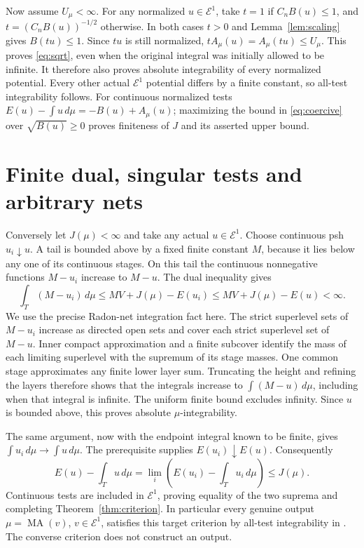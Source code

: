 \documentclass[11pt]{article}
\newcommand{\MA}{\operatorname{MA}}
\newcommand{\E}{\mathcal E}
\begin{document}
Now assume $U_\mu<\infty$. For any normalized $u\in\E^1$, take
$t=1$ if $C_nB(u)\leq1$, and
$t=(C_nB(u))^{-1/2}$ otherwise. In both cases $t>0$ and
Lemma~\ref{lem:scaling} gives $B(tu)\leq1$. Since $tu$ is still
normalized, $tA_\mu(u)=A_\mu(tu)\leq U_\mu$.
This proves \eqref{eq:sqrt}, even when the original integral was
initially allowed to be infinite. It therefore also proves
absolute integrability of every normalized potential. Every other
actual $\E^1$ potential differs by a finite constant, so all-test
integrability follows. For continuous normalized tests
$E(u)-\int u\,d\mu=-B(u)+A_\mu(u)$; maximizing the bound in
\eqref{eq:coercive} over $\sqrt{B(u)}\geq0$ proves finiteness of
$J$ and its asserted upper bound.

\section{Finite dual, singular tests and arbitrary nets}

Conversely let $J(\mu)<\infty$ and take any actual $u\in\E^1$.
Choose continuous psh $u_i\downarrow u$. A tail is bounded above
by a fixed finite constant $M$, because it lies below any one of
its continuous stages. On this tail the continuous nonnegative
functions $M-u_i$ increase to $M-u$. The dual inequality gives
\[
 \int_T(M-u_i)\,d\mu
   \leq MV+J(\mu)-E(u_i)
   \leq MV+J(\mu)-E(u)<\infty.
\]
We use the precise Radon-net integration fact here. The strict
superlevel sets of $M-u_i$ increase as directed open sets and cover
each strict superlevel set of $M-u$. Inner compact approximation
and a finite subcover identify the mass of each limiting superlevel
with the supremum of its stage masses. One common stage approximates
any finite lower layer sum. Truncating the height and refining the
layers therefore shows that the integrals increase to
$\int(M-u)\,d\mu$, including when that integral is infinite.
The uniform finite bound excludes infinity. Since $u$ is bounded
above, this proves absolute $\mu$-integrability.

The same argument, now with the endpoint integral known to be
finite, gives $\int u_i\,d\mu\to\int u\,d\mu$.
The prerequisite supplies $E(u_i)\downarrow E(u)$. Consequently
\[
 E(u)-\int_Tu\,d\mu
       =\lim_i\left(E(u_i)-\int_Tu_i\,d\mu\right)\leq J(\mu).
\]
Continuous tests are included in $\E^1$, proving equality of the
two suprema and completing Theorem~\ref{thm:criterion}.
In particular every genuine output $\mu=\MA(v)$, $v\in\E^1$,
satisfies this target criterion by all-test integrability in
\cite{O}. The converse criterion does not construct an output.
\end{document}
